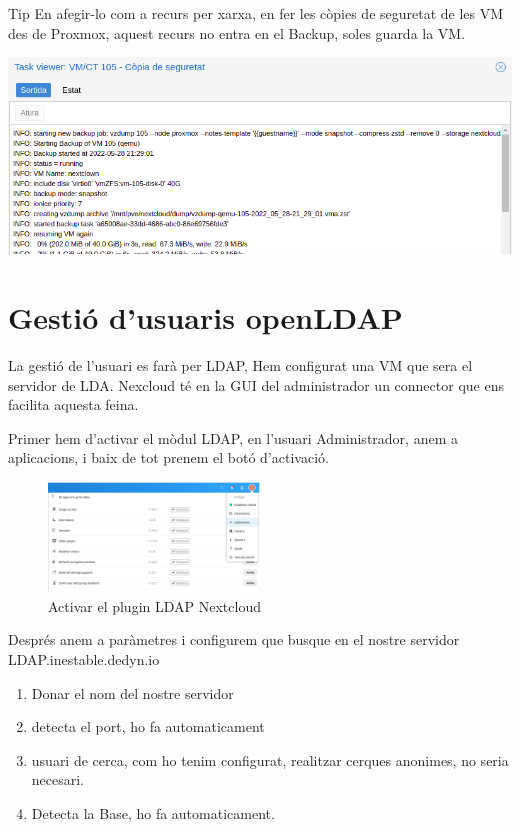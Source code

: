\documentclass[
  10pt,
]{krantz}
\providecommand{\tightlist}{%
  \setlength{\itemsep}{0pt}\setlength{\parskip}{0pt}}
\begin{document}
\begin{rmdtip}{Tip}
En afegir-lo com a recurs per xarxa, en fer les còpies de seguretat de les VM des de Proxmox, aquest recurs no entra en el Backup, soles guarda la VM.

\includegraphics{imatges/proxmox/copiaSeg_prova_mnt_nfs.png}

\end{rmdtip}

\hypertarget{gestiuxf3-dusuaris-openldap}{%
\section{Gestió d'usuaris openLDAP}\label{gestiuxf3-dusuaris-openldap}}

La gestió de l'usuari es farà per LDAP, Hem configurat una VM que sera el servidor de LDA. Nexcloud té en la GUI del administrador un connector que ens facilita aquesta feina.

Primer hem d'activar el mòdul LDAP, en l'usuari Administrador, anem a aplicacions, i baix de tot prenem el botó d'activació.

\begin{figure}
\centering
\includegraphics[width=0.5\textwidth,height=\textheight]{imatges/proxmox/activa_ldap_next.png}
\caption{Activar el plugin LDAP Nextcloud}
\end{figure}

Després anem a paràmetres i configurem que busque en el nostre servidor LDAP.inestable.dedyn.io

\begin{enumerate}
\def\labelenumi{\arabic{enumi}.}
\tightlist
\item
  Donar el nom del nostre servidor
\item
  detecta el port, ho fa automaticament
\item
  usuari de cerca, com ho tenim configurat, realitzar cerques anonimes, no seria necesari.
\item
  Detecta la Base, ho fa automaticament.
\end{enumerate}
\end{document}
